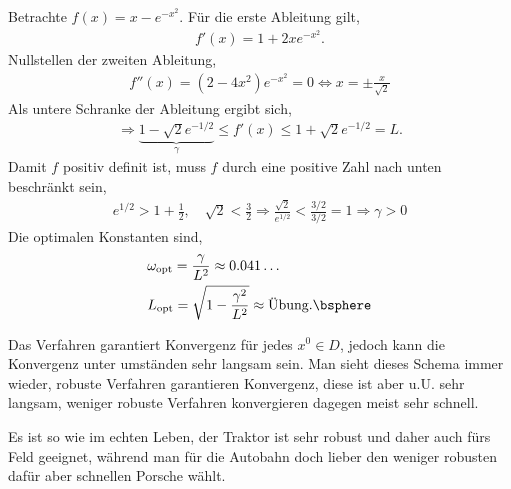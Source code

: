 \begin{bspn}
Betrachte $f(x) = x-e^{-x^2}$. Für die erste Ableitung gilt,
\begin{align*}
f'(x) = 1+2xe^{-x^2}.
\end{align*}
Nullstellen der zweiten Ableitung,
\begin{align*}
f''(x) = (2-4x^2) e^{-x^2} = 0 \Leftrightarrow x = \pm\frac{x}{\sqrt{2}}
\end{align*}
Als untere Schranke der Ableitung ergibt sich,
\begin{align*}
\Rightarrow \underbrace{1-\sqrt{2}e^{-1/2}}_{\gamma} \le f'(x) \le
1+\sqrt{2}e^{-1/2} = L.
\end{align*}
Damit $f$ positiv definit ist, muss $f$ durch eine positive Zahl nach unten
beschränkt sein,
\begin{align*}
e^{1/2} > 1 + \frac{1}{2},\quad \sqrt{2} < \frac{3}{2}
\Rightarrow \frac{\sqrt{2}}{e^{1/2}} <\frac{3/2}{3/2} = 1 \Rightarrow \gamma >0
\end{align*}
Die optimalen Konstanten sind,
\begin{align*}
&\omega_\text{opt} = \frac{\gamma}{L^2}\approx 0.041\ldots\\
&L_\text{opt} = \sqrt{1-\frac{\gamma^2}{L^2}} \approx \text{Übung}.\bsphere
\end{align*}
\end{bspn}

\begin{bemn}
Das Verfahren garantiert Konvergenz für jedes $x^0\in D$, jedoch kann die
Konvergenz unter umständen sehr langsam sein. Man sieht dieses Schema immer
wieder, robuste Verfahren garantieren Konvergenz, diese ist aber u.U. sehr
langsam, weniger robuste Verfahren konvergieren dagegen meist sehr schnell.

Es ist so wie im echten Leben, der Traktor ist sehr robust und daher auch fürs
Feld geeignet, während man für die Autobahn doch lieber den weniger robusten
dafür aber schnellen Porsche wählt.\maphere
\end{bemn}

